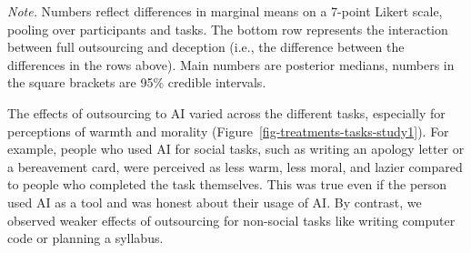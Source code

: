 \documentclass[
  man,
  floatsintext,
  longtable,
  nolmodern,
  notxfonts,
  notimes,
  colorlinks=true,linkcolor=blue,citecolor=blue,urlcolor=blue]{apa7}
\begin{document}
\begin{table}
\vspace{-20pt}
\noindent \emph{Note.} Numbers reflect differences in marginal means on
a 7-point Likert scale, pooling over participants and tasks. The bottom
row represents the interaction between full outsourcing and deception
(i.e., the difference between the differences in the rows above). Main
numbers are posterior medians, numbers in the square brackets are 95\%
credible intervals.

\end{table}

The effects of outsourcing to AI varied across the different tasks,
especially for perceptions of warmth and morality
(Figure~\ref{fig-treatments-tasks-study1}). For example, people who used
AI for social tasks, such as writing an apology letter or a bereavement
card, were perceived as less warm, less moral, and lazier compared to
people who completed the task themselves. This was true even if the
person used AI as a tool and was honest about their usage of AI. By
contrast, we observed weaker effects of outsourcing for non-social tasks
like writing computer code or planning a syllabus.
\end{document}
